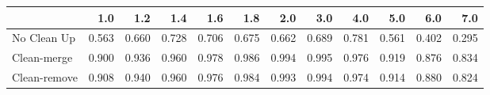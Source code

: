 \begin{tabular}{lrrrrrrrrrrr}
\toprule
{} &   1.0 &   1.2 &   1.4 &   1.6 &   1.8 &   2.0 &   3.0 &   4.0 &   5.0 &   6.0 &   7.0 \\
\midrule
No Clean Up  & 0.563 & 0.660 & 0.728 & 0.706 & 0.675 & 0.662 & 0.689 & 0.781 & 0.561 & 0.402 & 0.295 \\
Clean-merge  & 0.900 & 0.936 & 0.960 & 0.978 & 0.986 & 0.994 & 0.995 & 0.976 & 0.919 & 0.876 & 0.834 \\
Clean-remove & 0.908 & 0.940 & 0.960 & 0.976 & 0.984 & 0.993 & 0.994 & 0.974 & 0.914 & 0.880 & 0.824 \\
\bottomrule
\end{tabular}
